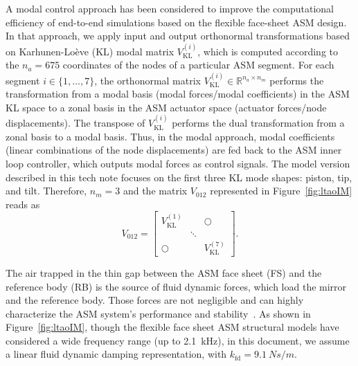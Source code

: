\documentclass{gmto}
\begin{document}
A modal control approach has been considered to improve the computational efficiency of end-to-end simulations based on the flexible face-sheet ASM design. In that approach, we apply input and output orthonormal transformations based on Karhunen-Loève (KL) modal matrix $V_\text{KL}^{(i)}$, which is computed according to the $n_a=675$ coordinates of the nodes of a particular ASM segment. %
%
For each segment $i \in \{1,\ldots,7\}$, the orthonormal matrix $V_\text{KL}^{(i)} \in \mathbb{R}^{n_a \times n_m}$ performs the transformation from a modal basis (modal forces/modal coefficients) in the ASM KL space to a zonal basis in the ASM actuator space (actuator forces/node displacements). The transpose of  $V_\text{KL}^{(i)}$ performs the dual transformation from a zonal basis to a modal basis. %
%
%
Thus, in the modal approach, modal coefficients (linear combinations of the node displacements) are fed back to the ASM inner loop controller, which outputs modal forces as control signals. The model version described in this tech note focuses on the first three KL mode shapes: piston, tip, and tilt. Therefore, $n_m=3$ and the matrix $V_\text{012}$ represented in Figure~\ref*{fig:ltaoIM} reads as
\[
V_\text{012} = \begin{bmatrix}
    V_\text{KL}^{(1)} & & \bigcirc \\
    & \ddots & \\
    \bigcirc & & V_\text{KL}^{(7)}
\end{bmatrix}.
\]

The air trapped in the thin gap between the ASM face sheet (FS) and the reference body (RB) is the source of fluid dynamic forces, which load the mirror and the reference body. Those forces are not negligible and can highly characterize the ASM system's performance and stability~\cite{ADP_PhasingRep2021}. %
%
As shown in Figure~\ref*{fig:ltaoIM}, though the flexible face sheet ASM structural models have considered a wide frequency range (up to \SI{2.1}{kHz}), in this document, we assume a linear fluid dynamic damping representation, with $k_\text{fd}=\SI{9.1}{Ns/m}$.
\end{document}
